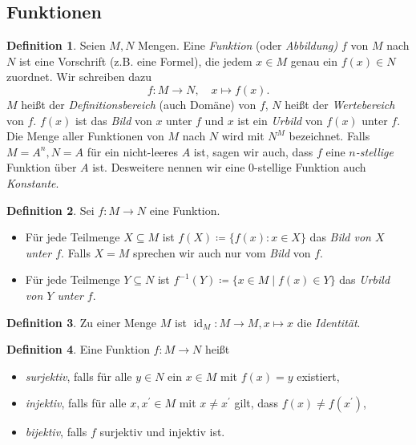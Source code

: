 \documentclass[11pt, a4paper]{article}
\theoremstyle{definition}
\newtheorem{definition}{Definition}[section]
\theoremstyle{plain}
\numberwithin{equation}{section}
\DeclareMathOperator{\id}{id}
\begin{document}
\subsection{Funktionen}\label{sec:pre_mappings}
\begin{definition}
	Seien \( M, N \) Mengen. Eine \textit{Funktion} (oder \textit{Abbildung)} \( f \) von \( M \) nach \( N \) ist eine Vorschrift (z.B. eine Formel), die jedem \( x \in M \) genau ein \( f(x) \in N \) zuordnet. Wir schreiben dazu
	\[
		f\colon M \to N, \quad x \mapsto f(x).
	\]
	\( M \) heißt der \textit{Definitionsbereich} (auch Domäne) von \( f \), \( N \) heißt der \textit{Wertebereich} von \( f \). \( f(x) \) ist das \textit{Bild} von \( x \) unter \( f \) und \( x \) ist ein \textit{Urbild} von \( f(x) \) unter \( f \). Die Menge aller Funktionen von \( M \) nach \( N \) wird mit \( N^M \) bezeichnet. Falls \( M = A^n, N = A \) für ein nicht-leeres \( A \) ist, sagen wir auch, dass \( f \) eine \textit{\( n \)-stellige} Funktion über \( A \) ist. Desweitere nennen wir eine \( 0 \)-stellige Funktion auch \textit{Konstante}.
\end{definition}
\begin{definition}
	Sei \( f\colon M \to N \) eine Funktion.
	\begin{itemize}
		\item Für jede Teilmenge \( X \subseteq M \) ist \( f(X) \coloneqq \{ f(x) : x \in X \} \) das \textit{Bild von \( X \) unter \( f \)}. Falls \( X = M \) sprechen wir auch nur vom \textit{Bild} von \( f \).
		\item Für jede Teilmenge \( Y \subseteq N \) ist \( f^{-1}(Y) \coloneqq \{ x \in M \mid f(x) \in Y \} \) das \textit{Urbild von \( Y \) unter \( f \)}.
	\end{itemize}
\end{definition}
\begin{definition}
	Zu einer Menge \( M \) ist \( \id_M\colon M \to M, x \mapsto x \) die \textit{Identität}.
\end{definition}
\begin{definition}
	Eine Funktion \( f\colon M \to N \) heißt
	\begin{itemize}
		\item \textit{surjektiv}, falls für alle \( y \in N \) ein \( x \in M \) mit \( f(x) = y \) existiert,
		\item \textit{injektiv}, falls für alle \( x, x^\prime \in M \) mit \( x \neq x^\prime \) gilt, dass \( f(x) \neq f(x^\prime) \),
		\item \textit{bijektiv}, falls \( f \) surjektiv und injektiv ist.
	\end{itemize}
\end{definition}
\end{document}
